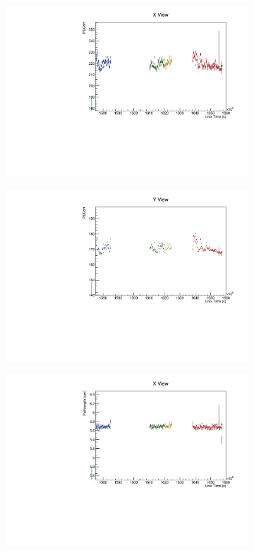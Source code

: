 \documentclass[12pt,a4paper]{article}
\begin{document}
\begin{figure}[!ht]
\begin{subfigure}{0.5\textwidth}
  \end{subfigure}
  \begin{subfigure}{0.5\textwidth}
    \includegraphics[width=\linewidth]{driftsec_tb/pecorr_time_x.pdf}
  \end{subfigure}
  \begin{subfigure}{0.5\textwidth}
    \includegraphics[width=\linewidth]{driftsec_tb/pecorr_time_y.pdf}
  \end{subfigure}
  \begin{subfigure}{0.5\textwidth}
    \includegraphics[width=\linewidth]{driftsec_tb/cm_time_x.pdf}

\end{subfigure}
\end{figure}
\end{document}
